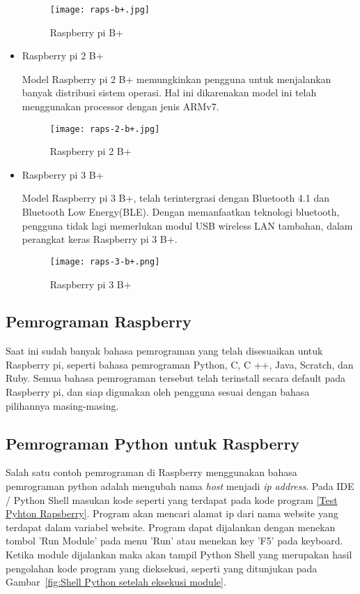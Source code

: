 \begin{itemize}
     \begin{figure}[H]
    	\centering  
    	\texttt{[image: raps-b+.jpg]}  
    	\caption[Raspberry pi B+]{Raspberry pi B+} 
    	\label{fig:Raspberry pi B+} 
    \end{figure}
    
    \item Raspberry pi 2 B+
    
    Model Raspberry pi 2 B+ memungkinkan pengguna untuk menjalankan banyak distribusi sistem operasi. Hal ini dikarenakan model ini telah menggunakan processor dengan jenis ARMv7.
    
    \begin{figure}[H]
    	\centering  
    	\texttt{[image: raps-2-b+.jpg]}  
    	\caption[Raspberry pi 2 B+]{Raspberry pi 2 B+} 
    	\label{fig:Raspberry pi 2 B+} 
    \end{figure}
    
    \item Raspberry pi 3 B+
    
    Model Raspberry pi 3 B+, telah terintergrasi dengan Bluetooth 4.1 dan Bluetooth Low Energy(BLE). Dengan memanfaatkan teknologi bluetooth, pengguna tidak lagi memerlukan modul USB wireless LAN tambahan, dalam perangkat keras Raspberry pi 3 B+.
    
    \begin{figure}[H]
    	\centering  
    	\texttt{[image: raps-3-b+.png]}  
    	\caption[Raspberry pi 3 B+]{Raspberry pi 3 B+} 
    	\label{fig:Raspberry pi 3 B+} 
    \end{figure}
\end{itemize}

\subsection{Pemrograman Raspberry}
Saat ini sudah banyak bahasa pemrograman yang telah disesuaikan untuk Raspberry pi, seperti bahasa pemrograman Python, C, C ++, Java, Scratch, dan Ruby. Semua bahasa pemrograman tersebut telah terinstall secara default pada Raspberry pi, dan siap digunakan oleh pengguna sesuai dengan bahasa pilihannya masing-masing.

\subsection{Pemrograman Python untuk Raspberry}
Salah satu contoh pemrograman di Raspberry menggunakan bahasa pemrograman python adalah mengubah nama \textit{host} menjadi \textit{ip address}. Pada IDE / Python Shell masukan kode seperti yang terdapat pada kode program \ref{Test Pyhton Rapsberry}. Program akan mencari alamat ip dari nama website yang terdapat dalam variabel website. Program dapat dijalankan dengan menekan tombol 'Run Module' pada menu 'Run' atau menekan key 'F5' pada keyboard. Ketika module dijalankan maka akan tampil Python Shell yang merupakan hasil pengolahan kode program yang dieksekusi, seperti yang ditunjukan pada Gambar~\ref{fig:Shell Python setelah eksekusi module}. 

